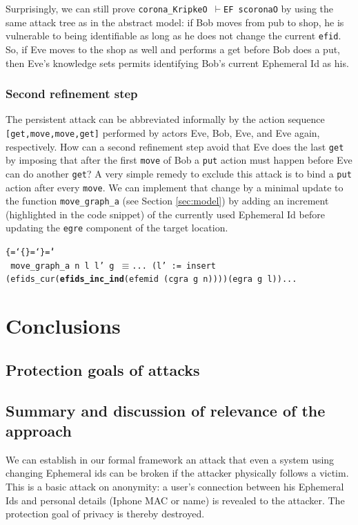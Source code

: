 \documentclass{llncs}
\newenvironment{ttbox}{\begin{alltt}\ttbraces\small\tt}%
                      {\end{alltt}}
\def\ttbraces{\let\.=\nobreak\chardef\{=`\{\chardef\}=`\}\chardef\|=`\\}
\newcommand\ttequiv{\mbox{{$\equiv$}}}
\newcommand\ttvdash{\mbox{{$\vdash$}}}
\begin{document}
Surprisingly, we can still prove \texttt{corona\_KripkeO \ttvdash EF scoronaO} by using the
same attack tree as in the abstract model: if Bob moves from pub to shop, he is vulnerable to
being identifiable as long as he does not change the current \texttt{efid}. So, if Eve moves to
the shop as well and performs a get before Bob does a put, then Eve's knowledge sets permits identifying
Bob's current Ephemeral Id as his.

\subsubsection{Second refinement step}
The persistent attack can be abbreviated informally by the action sequence \texttt{[get,move,move,get]}
performed by actors Eve, Bob, Eve, and Eve again, respectively.
How can a second refinement step avoid that Eve does the last \texttt{get} by imposing that after the
first \texttt{move} of Bob a \texttt{put} action must happen before Eve can do another \texttt{get}?
A very simple remedy to exclude this attack is to bind a \texttt{put} action after every \texttt{move}.
We can implement that change by a minimal update to the function \texttt{move\_graph\_a} (see Section \ref{sec:model})
by adding an increment (highlighted in the code snippet)
of the currently used Ephemeral Id before updating the \texttt{egre} component of the target location.
\begin{ttbox}
move\_graph\_a n l l' g \ttequiv ...
  (l' := insert (efids_cur({\bf efids\_inc\_ind}(efemid (cgra g n))))(egra g l))...
\end{ttbox}  

\section{Conclusions}
\label{sec:concl}
\subsection{Protection goals of attacks}

\subsection{Summary and discussion of relevance of the approach}
We can establish in our formal framework an attack that even a system using changing
Ephemeral ids can be broken if the attacker physically follows a victim. This is a basic attack on
anonymity: a user's connection between his Ephemeral Ids and personal details (Iphone MAC or name)
is revealed to the attacker. The protection goal of privacy is thereby destroyed.
\end{document}
